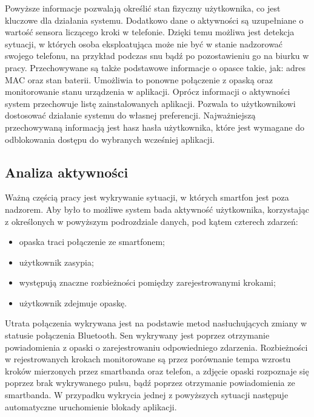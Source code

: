 \indent Powyższe informacje pozwalają określić stan fizyczny użytkownika, co jest kluczowe dla działania systemu. Dodatkowo dane o aktywności są uzupełniane
o wartość sensora liczącego kroki w telefonie. Dzięki temu możliwa jest detekcja sytuacji, w których osoba eksploatująca może nie być w stanie
nadzorować swojego telefonu, na przykład podczas snu bądź po pozostawieniu go na biurku w pracy. Przechowywane są także podstawowe informacje o opasce takie, jak: adres MAC oraz stan baterii. Umożliwia to ponowne połączenie z opaską oraz monitorowanie stanu urządzenia w aplikacji.
\newline\newline
\indent Oprócz informacji o aktywności system przechowuje listę zainstalowanych aplikacji. Pozwala to użytkownikowi dostosować działanie systemu do własnej preferencji. Najważniejszą przechowywaną informacją jest hasz hasła użytkownika, które jest wymagane do odblokowania dostępu do wybranych wcześniej aplikacji.

\subsection{Analiza aktywności}
Ważną częścią pracy jest wykrywanie sytuacji, w których smartfon jest poza nadzorem. Aby było to możliwe
system bada aktywność użytkownika, korzystając z określonych w powyższym podrozdziale danych, pod kątem czterech zdarzeń:
\begin{itemize}
    \item opaska traci połączenie ze smartfonem;
    \item użytkownik zasypia;
    \item występują znaczne rozbieżności pomiędzy zarejestrowanymi krokami;
    \item użytkownik zdejmuje opaskę.
\end{itemize}

\indent Utrata połączenia wykrywana jest na podstawie metod nasłuchujących zmiany w statusie połączenia Bluetooth. Sen wykrywany jest poprzez
otrzymanie powiadomienia z opaski o zarejestrowaniu odpowiedniego zdarzenia. Rozbieżności
w rejestrowanych krokach monitorowane są przez porównanie tempa wzrostu kroków mierzonych przez smartbanda oraz telefon, a zdjęcie opaski rozpoznaje się
poprzez brak wykrywanego pulsu, bądź poprzez otrzymanie powiadomienia ze smartbanda. W przypadku wykrycia jednej z powyższych sytuacji następuje
automatyczne uruchomienie blokady aplikacji.

